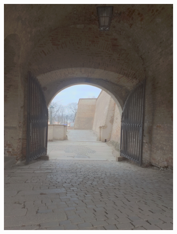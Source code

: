 \begin{figure}[h!]
  \centering
  \begin{subfigure}{0.3\textwidth}
      \includegraphics[width=\textwidth]{figures/tests/tmo/drag1}
  \end{subfigure}
  ~
  \begin{subfigure}{0.3\textwidth}

\end{subfigure}
\end{figure}

